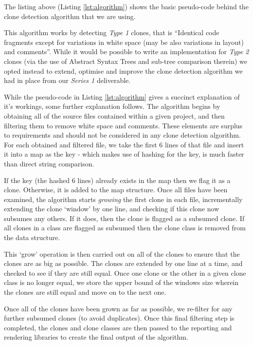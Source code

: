 \documentclass{article}
\begin{document}
The listing above (Listing \ref{lst:algorithm}) shows the basic pseudo-code behind the clone detection algorithm that we are using.

This algorithm works by detecting \textit{Type 1} clones, that is ``Identical code fragments except for variations in white space (may be also
variations in layout) and comments''\cite{cloningsurvey}. While it would be possible to write an implementation for \textit{Type 2} clones (via the use of Abstract Syntax Trees and sub-tree comparison therein) we opted instead to extend, optimise and improve the clone detection algorithm we had in place from our \textit{Series 1} deliverable.

While the pseudo-code in Listing \ref{lst:algorithm} gives a succinct explanation of it's workings, some further explanation follows. The algorithm begins by obtaining all of the source files contained within a given project, and then filtering them to remove white space and comments. These elements are surplus to requirements and should not be considered in any clone detection algorithm. For each obtained and filtered file, we take the first 6 lines of that file and insert it into a map as the key - which makes use of hashing for the key, is much faster than direct string comparison.

If the key (the hashed 6 lines) already exists in the map then we flag it as a clone. Otherwise, it is added to the map structure. Once all files have been examined, the algorithm starts \textit{growing} the first clone in each file, incrementally extending the clone `window' by one line, and checking if this clone now subsumes any others. If it does, then the clone is flagged as a subsumed clone. If all clones in a class are flagged as subsumed then the clone class is removed from the data structure.

This `grow' operation is then carried out on all of the clones to ensure that the clones are as big as possible. The clones are extended by one line at a time, and checked to see if they are still equal. Once one clone or the other in a given clone class is no longer equal, we store the upper bound of the windows size wherein the clones are still equal and move on to the next one.

Once all of the clones have been grown as far as possible, we re-filter for any further subsumed clones (to avoid duplicates). Once this final filtering step is completed, the clones and clone classes are then passed to the reporting and rendering libraries to create the final output of the algorithm.
\end{document}
